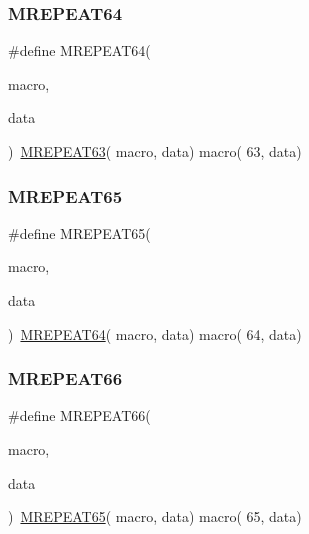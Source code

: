 \mbox{\label{group__group__sam0__utils__mrepeat_gae9165e7c138bde7089d78f4d39123c80}} 
\subsubsection{\texorpdfstring{MREPEAT64}{MREPEAT64}}
{\footnotesize\ttfamily \#define M\+R\+E\+P\+E\+A\+T64(\begin{DoxyParamCaption}\item[{}]{macro,  }\item[{}]{data }\end{DoxyParamCaption})~\mbox{\hyperlink{group__group__sam0__utils__mrepeat_ga73cede98c09bbcf55a373fbd3cfef422}{M\+R\+E\+P\+E\+A\+T63}}( macro, data)   macro( 63, data)}

\mbox{\label{group__group__sam0__utils__mrepeat_ga823d5579d3d70018be17ac8323d074be}} 
\subsubsection{\texorpdfstring{MREPEAT65}{MREPEAT65}}
{\footnotesize\ttfamily \#define M\+R\+E\+P\+E\+A\+T65(\begin{DoxyParamCaption}\item[{}]{macro,  }\item[{}]{data }\end{DoxyParamCaption})~\mbox{\hyperlink{group__group__sam0__utils__mrepeat_gae9165e7c138bde7089d78f4d39123c80}{M\+R\+E\+P\+E\+A\+T64}}( macro, data)   macro( 64, data)}

\mbox{\label{group__group__sam0__utils__mrepeat_ga900ae85fc32323d04086e2dd4ce7a275}} 
\subsubsection{\texorpdfstring{MREPEAT66}{MREPEAT66}}
{\footnotesize\ttfamily \#define M\+R\+E\+P\+E\+A\+T66(\begin{DoxyParamCaption}\item[{}]{macro,  }\item[{}]{data }\end{DoxyParamCaption})~\mbox{\hyperlink{group__group__sam0__utils__mrepeat_ga823d5579d3d70018be17ac8323d074be}{M\+R\+E\+P\+E\+A\+T65}}( macro, data)   macro( 65, data)}

